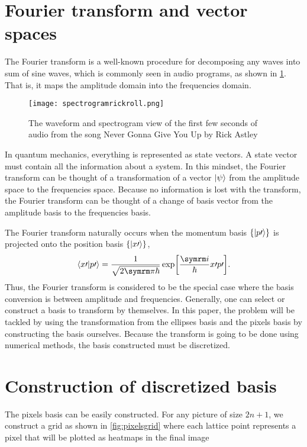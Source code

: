 \section{Fourier transform and vector spaces}

The Fourier transform is a well-known procedure for decomposing any waves into sum of sine waves, which is commonly seen in audio programs, as shown in \cref{fig:audiogram}. That is, it maps the amplitude domain into the frequencies domain.
\begin{figure}[ht]
    \centering
    \texttt{[image: spectrogramrickroll.png]}
    \caption{The waveform and spectrogram view of the first few seconds of audio from the song Never Gonna Give You Up by Rick Astley}
    \label{fig:audiogram}
\end{figure}

In quantum mechanics, everything is represented as state vectors. A state vector must contain all the information about a system. In this mindset, the Fourier transform can be thought of a transformation of a vector $\ket{\psi}$ from the amplitude space to the frequencies space. Because no information is lost with the transform, the Fourier transform can be thought of a change of basis vector from the amplitude basis to the frequencies basis.

The Fourier transform naturally occurs when the momentum basis $\{\ket{p\prime}\}$ is projected onto the position basis $\{\ket{x\prime}\}$,
\begin{equation}
    \braket{x\prime}{p\prime} = \frac{1}{\sqrt{2\cpi\hbar}}\exp[\frac{\iu}{\hbar}x\prime p\prime].
\end{equation}
Thus, the Fourier transform is considered to be the special case where the basis conversion is between amplitude and frequencies. Generally, one can select or construct a basis to transform by themselves. In this paper, the problem will be tackled by using the transformation from the ellipses basis and the pixels basis by constructing the basis ourselves. Because the transform is going to be done using numerical methods, the basis constructed must be discretized.

\section{Construction of discretized basis}

The pixels basis can be easily constructed. For any picture of size $2n + 1$, we construct a grid as shown in \cref{fig:pixelsgrid} where each lattice point represents a pixel that will be plotted as heatmaps in the final image